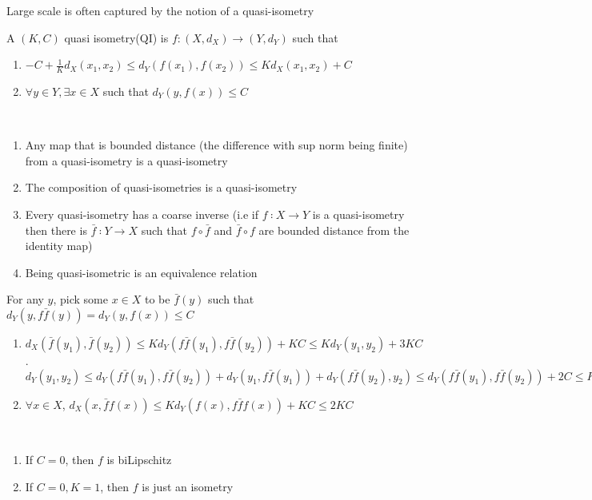 \documentclass[main]{subfiles}
\begin{document}
Large scale is often captured by the notion of a quasi-isometry

\begin{definition}
A $(K,C)$ quasi isometry(QI) is $f:(X,d_X)\to(Y,d_Y)$ such that
\begin{enumerate}
\item $-C+\frac{1}{K}d_X(x_1,x_2)\leq d_Y(f(x_1),f(x_2))\leq Kd_X(x_1,x_2)+C$
\item $\forall y\in Y,\exists x\in X$ such that $d_Y(y,f(x))\leq C$
\end{enumerate}
\end{definition}

\begin{exercise}\hfill\\
\begin{enumerate}
\item Any map that is bounded distance (the difference with sup norm being finite) from a quasi-isometry is a quasi-isometry
\item The composition of quasi-isometries is a quasi-isometry
\item Every quasi-isometry has a coarse inverse (i.e if $f ∶ X \to Y$ is a quasi-isometry then there is $\bar f ∶ Y \to X$ such that $f\circ\bar f$ and $\bar f\circ f$ are bounded distance from the identity map)
\item Being quasi-isometric is an equivalence relation
\end{enumerate}
\end{exercise}

\begin{solution}
For any $y$, pick some $x\in X$ to be $\bar f(y)$ such that $d_Y(y,f\bar f(y))=d_Y(y,f(x))\leq C$
\begin{enumerate}
\item $d_X(\bar f(y_1),\bar f(y_2))\leq Kd_Y(f\bar f(y_1),f\bar f(y_2))+KC\leq Kd_Y(y_1,y_2)+3KC$. $d_Y(y_1,y_2)\leq d_Y(f\bar f(y_1),f\bar f(y_2))+d_Y(y_1,f\bar f(y_1))+d_Y(f\bar f(y_2),y_2)\leq d_Y(f\bar f(y_1),f\bar f(y_2))+2C\leq Kd_X(\bar f(y_1),\bar f(y_2))+3C$
\item $\forall x\in X$, $d_X(x,\bar ff(x))\leq Kd_Y(f(x),f\bar ff(x))+KC\leq 2KC$
\end{enumerate}
\end{solution}

\begin{note} \hfill \\
\begin{enumerate}
\item If $C=0$, then $f$ is biLipschitz
\item If $C=0,K=1$, then $f$ is just an isometry
\end{enumerate}
\end{note}
\end{document}
